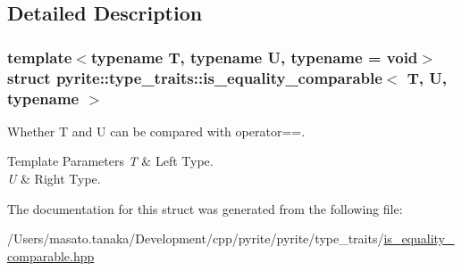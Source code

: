 \subsection{Detailed Description}
\subsubsection*{template$<$typename T, typename U, typename = void$>$\newline
struct pyrite\+::type\+\_\+traits\+::is\+\_\+equality\+\_\+comparable$<$ T, U, typename $>$}

Whether T and U can be compared with operator==. 
\begin{DoxyTemplParams}{Template Parameters}
{\em T} & Left Type. \\
\hline
{\em U} & Right Type. \\
\hline
\end{DoxyTemplParams}


The documentation for this struct was generated from the following file\+:\begin{DoxyCompactItemize}
\item 
/\+Users/masato.\+tanaka/\+Development/cpp/pyrite/pyrite/type\+\_\+traits/\mbox{\hyperlink{is__equality__comparable_8hpp}{is\+\_\+equality\+\_\+comparable.\+hpp}}\end{DoxyCompactItemize}
